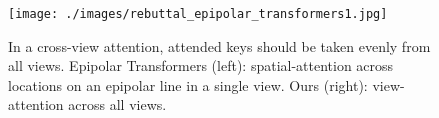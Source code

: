 \begin{figure}[b]
\vspace{-5pt}
\centering
\texttt{[image: ./images/rebuttal\_epipolar\_transformers1.jpg]}
\vspace{-20pt}
\caption{
In a cross-view attention, attended keys should be taken evenly from all views. 
Epipolar Transformers (left): spatial-attention across locations on an epipolar line in a single view.
Ours (right): view-attention across all views.
} 
\label{fig:rebuttal_epipolar_transformers}
\vspace{-5pt}
\end{figure}
